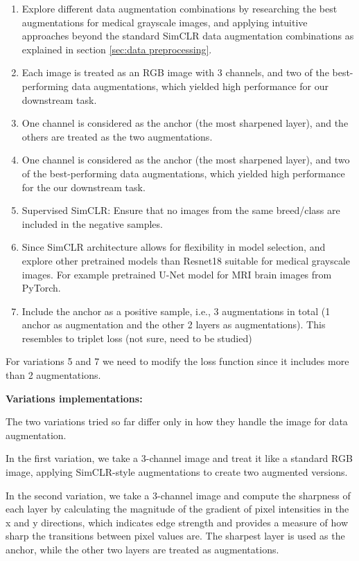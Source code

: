 \begin{enumerate}
  \item Explore different data augmentation combinations by researching the best augmentations for medical grayscale images, and applying intuitive approaches beyond the standard SimCLR \cite{chen2020simple} data augmentation combinations as explained in section \ref{sec:data preprocessing}.
  \item Each image is treated as an RGB image with 3 channels, and two of the best-performing data augmentations, which yielded high performance for our downstream task.

  \item One channel is considered as the anchor (the most sharpened layer), and the others are treated as the two augmentations.
  \item One channel is considered as the anchor (the most sharpened layer), and two of the best-performing data augmentations, which yielded high performance for the our downstream task.
  \item Supervised SimCLR: Ensure that no images from the same breed/class are included in the negative samples.
  \item Since SimCLR architecture \cite{chen2020simple} allows for flexibility in model selection, and explore other pretrained models  than Resnet18  suitable for medical grayscale images. For example pretrained U-Net \cite{ronneberger2015unetconvolutionalnetworksbiomedical} model for MRI brain images from PyTorch.  
  \item Include the anchor as a positive sample, i.e., 3 augmentations in total (1 anchor as augmentation and the other 2 layers as augmentations). This resembles to triplet loss (not sure, need to be studied)  
\end{enumerate}
For variations 5 and 7 we need to modify the loss function since it includes more than 2 augmentations.

\textbf{Variations implementations:}  \label{sec:variations_implementations}

The two variations tried so far differ only in how they handle the image for data augmentation. 

In the first variation, we take a 3-channel image and treat it like a standard RGB image, applying SimCLR-style augmentations to create two augmented versions.

In the second variation, we take a 3-channel image and compute the sharpness of each layer by calculating the magnitude of the gradient of pixel intensities in the x and y directions, which indicates edge strength and provides a measure of how sharp the transitions between pixel values are. The sharpest layer is used as the anchor, while the other two layers are treated as augmentations. 


